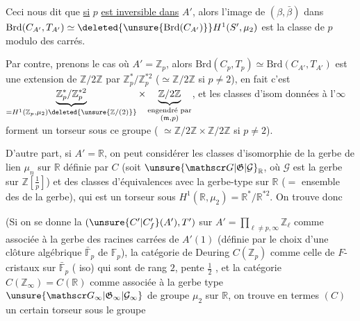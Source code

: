 Ceci nous dit que \uline{si} $p$ \uline{est inversible dans} $A'$, alors
l'image de $(\beta,\bar\beta)$ dans $\mathrm{Brd}(C_{A'},T_{A'})\simeq\deleted{\unsure{\mathrm{Brd}(C_{A'})}}H^1(S',\mu_2)$
est la classe de $p$ modulo des carrés.

Par contre, prenons le cas où $A'=\mathbb Z_p$, alors
$\mathrm{Brd}(C_p,T_p)\simeq\mathrm{Brd}(C_{A'},T_{A'})$ est une extension de $\mathbb Z/2\mathbb Z$ par
$\mathbb Z_p^*/\mathbb Z_p^{*2}$ ($\simeq\mathbb Z/2\mathbb Z$ si $p\ne2$), en fait c'est
$\underbrace{\mathbb Z_p^*/\mathbb Z_p^{*2}}_{=H^1(\mathbb Z_p,\mu_2)\deleted{\unsure{\mathbb Z/(2)}}}\times
\underbrace{\mathbb Z/2\mathbb Z}_{\substack{\text{engendré par}\\(\mathfrak m,p)}}$, et les
classes d'isom  données à l'$\infty$  forment un torseur
sous ce groupe ( $\simeq\mathbb Z/2\mathbb Z\times\mathbb Z/2\mathbb Z$ si $p\ne2$).

D'autre part, si $A'=\mathbb R$, on peut considérer les classes d'isomorphie de la gerbe de lien $\mu_n$ sur $\mathbb R$ définie par $C$
(soit $\unsure{\mathscr G|\mathfrak G|\mathcal G}_{\mathbb R}$, où $\mathscr G$ est la gerbe sur $\mathbb Z[\frac1p]$) et  des
classes d'équivalences avec la gerbe-type sur $\mathbb R$
($=$ ensemble des \uline{} de la gerbe), qui est un
torseur sous $H^1(\mathbb R,\mu_2)=\mathbb R^*/\mathbb R^{*2}$. On trouve donc


(Si on se donne la  
$(\unsure{C'|C'_f}(A'),T')$ sur $A'=\prod_{\ell\ne p,\infty}\mathbb Z_\ell$ comme
associée à la gerbe des racines carrées de $A'(1)$ (définie
par le choix d'une clôture algébrique $\bar{\mathbb F}_p$ de $\mathbb F_p$),  la
catégorie de Deuring $C(\mathbb Z_p)$ comme celle de $F$-cristaux sur $\bar{\mathbb F}_p$
( iso) qui sont de rang $2$,  pente $\frac12$ , et la 
catégorie $C(\mathbb Z_\infty)=C(\mathbb R)$ comme associée à la gerbe
type $\unsure{\mathscr G_\infty|\mathfrak G_\infty|\mathcal G_\infty}$ de groupe $\mu_2$ sur $\mathbb R$, on trouve en termes  $(C)$ un
certain torseur  sous le groupe


